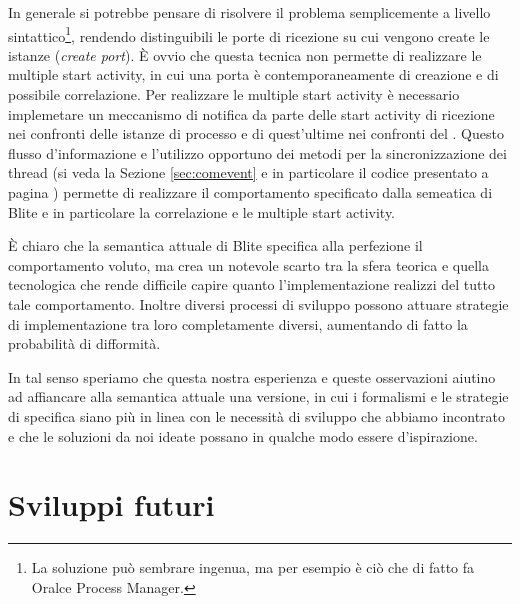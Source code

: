 In generale si potrebbe pensare di risolvere il problema semplicemente a livello
sintattico\footnote{La soluzione può sembrare ingenua, ma per esempio è ciò che
di fatto fa Oralce Process Manager.}, rendendo distinguibili le porte di
ricezione su cui vengono create le istanze (\emph{create port}). \`E ovvio che
questa tecnica non permette di realizzare le multiple start activity, in cui una
porta è contemporaneamente di creazione e di possibile correlazione. Per
realizzare le multiple start activity è necessario implemetare un meccanismo di
notifica da parte delle start activity di ricezione nei confronti delle istanze
di processo e di quest'ultime nei confronti del . Questo
flusso d'informazione e l'utilizzo opportuno dei metodi per la sincronizzazione
dei thread (si veda la Sezione \ref{sec:comevent} e in particolare il codice
presentato a pagina \pageref{cod:wait}) permette di realizzare il comportamento
specificato dalla semeatica di Blite e in particolare la correlazione e le multiple start activity.


\`E chiaro che la semantica attuale di Blite specifica alla perfezione il
comportamento voluto, ma crea un notevole scarto tra la sfera teorica e quella
tecnologica che rende difficile capire quanto l'implementazione realizzi del
tutto tale comportamento. Inoltre diversi processi di sviluppo possono attuare
strategie di implementazione tra loro completamente diversi, aumentando di fatto
la probabilità di difformità.

In tal senso speriamo che questa nostra esperienza e queste osservazioni
aiutino ad affiancare alla semantica attuale una versione, in cui i formalismi e
le strategie di specifica siano più in linea con le necessità di sviluppo che
abbiamo incontrato e che le soluzioni da noi ideate possano in qualche modo
essere d'ispirazione.
  
\section{Sviluppi futuri}

